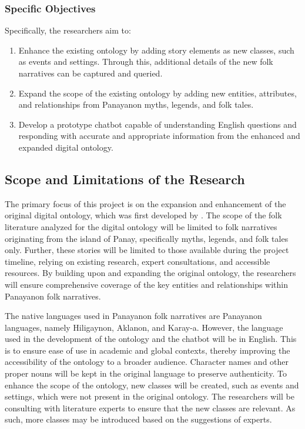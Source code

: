 \subsubsection{Specific Objectives}
\label{subsec:specificobjectives}
Specifically, the researchers aim to:
\begin{enumerate}
    \item Enhance the existing ontology by adding story elements as new classes, such as events and settings. Through this, additional details of the new folk narratives can be captured and queried.
    \item Expand the scope of the existing ontology by adding new entities, attributes, and relationships from Panayanon myths, legends, and folk tales. 
    \item Develop a prototype chatbot capable of understanding English questions and responding with accurate and appropriate information from the enhanced and expanded digital ontology.
\end{enumerate}


\subsection{Scope and Limitations of the Research}
\label{sec:scopelimitations}

The primary focus of this project is on the expansion and enhancement of the original digital ontology, which was first developed by . The scope of the folk literature analyzed for the digital ontology will be limited to folk narratives originating from the island of Panay, specifically myths, legends, and folk tales only. Further, these stories will be limited to those available during the project timeline, relying on existing research, expert consultations, and accessible resources. By building upon and expanding the original ontology, the researchers will ensure comprehensive coverage of the key entities and relationships within Panayanon folk narratives.

The native languages used in Panayanon folk narratives are Panayanon languages, namely Hiligaynon, Aklanon, and Karay-a. However, the language used in the development of the ontology and the chatbot will be in English. This is to ensure ease of use in academic and global contexts, thereby improving the accessibility of the ontology to a broader audience. Character names and other proper nouns will be kept in the original language to preserve authenticity.
To enhance the scope of the ontology, new classes will be created, such as events and settings, which were not present in the original ontology. The researchers will be consulting with literature experts to ensure that the new classes are relevant. As such, more classes may be introduced based on the suggestions of experts.

